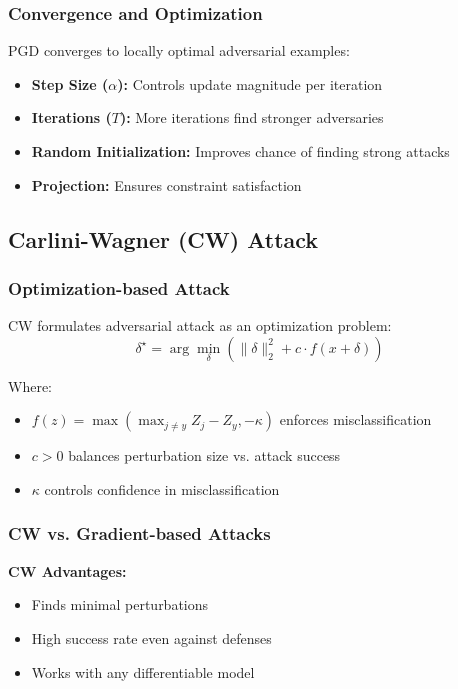 \documentclass[conference]{IEEEtran}
\begin{document}
\subsubsection{Convergence and Optimization}
\label{sec:q4_pgd_convergence}

PGD converges to locally optimal adversarial examples:
\begin{itemize}
  \item \textbf{Step Size ($\alpha$):} Controls update magnitude per iteration
  \item \textbf{Iterations ($T$):} More iterations find stronger adversaries
  \item \textbf{Random Initialization:} Improves chance of finding strong attacks
  \item \textbf{Projection:} Ensures constraint satisfaction
\end{itemize}

\subsection{Carlini-Wagner (CW) Attack}
\label{sec:q4_cw}

\subsubsection{Optimization-based Attack}
\label{sec:q4_cw_math}

CW formulates adversarial attack as an optimization problem:
\begin{equation}
\delta^\star = \arg\min_{\delta} \left(\|\delta\|_2^2 + c \cdot f(x + \delta)\right)
\label{eq:cw_optimization}
\end{equation}

Where:
\begin{itemize}
  \item $f(z) = \max(\max_{j \neq y} Z_j - Z_y, -\kappa)$ enforces misclassification
  \item $c > 0$ balances perturbation size vs. attack success
  \item $\kappa$ controls confidence in misclassification
\end{itemize}

\subsubsection{CW vs. Gradient-based Attacks}
\label{sec:q4_cw_comparison}

\textbf{CW Advantages:}
\begin{itemize}
  \item Finds minimal perturbations
  \item High success rate even against defenses
  \item Works with any differentiable model
\end{itemize}
\end{document}
